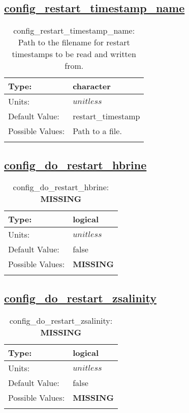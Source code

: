 \subsection[config\_restart\_timestamp\_name]{\hyperref[sec:nm_tab_restart]{config\_restart\_timestamp\_name}}
\label{subsec:nm_sec_config_restart_timestamp_name}
\begin{center}
\begin{longtable}{| p{2.0in} || p{4.0in} |}
    \hline
    Type: & character \\
    \hline
    Units: & $unitless$ \\
    \hline
    Default Value: & restart\_timestamp \\
    \hline
    Possible Values: & Path to a file. \\
    \hline
    \caption{config\_restart\_timestamp\_name: Path to the filename for restart timestamps to be read and written from.}
\end{longtable}
\end{center}
\subsection[config\_do\_restart\_hbrine]{\hyperref[sec:nm_tab_restart]{config\_do\_restart\_hbrine}}
\label{subsec:nm_sec_config_do_restart_hbrine}
\begin{center}
\begin{longtable}{| p{2.0in} || p{4.0in} |}
    \hline
    Type: & logical \\
    \hline
    Units: & $unitless$ \\
    \hline
    Default Value: & false \\
    \hline
    Possible Values: & {\bf \color{red} MISSING} \\
    \hline
    \caption{config\_do\_restart\_hbrine: {\bf \color{red} MISSING}}
\end{longtable}
\end{center}
\subsection[config\_do\_restart\_zsalinity]{\hyperref[sec:nm_tab_restart]{config\_do\_restart\_zsalinity}}
\label{subsec:nm_sec_config_do_restart_zsalinity}
\begin{center}
\begin{longtable}{| p{2.0in} || p{4.0in} |}
    \hline
    Type: & logical \\
    \hline
    Units: & $unitless$ \\
    \hline
    Default Value: & false \\
    \hline
    Possible Values: & {\bf \color{red} MISSING} \\
    \hline
    \caption{config\_do\_restart\_zsalinity: {\bf \color{red} MISSING}}
\end{longtable}
\end{center}
